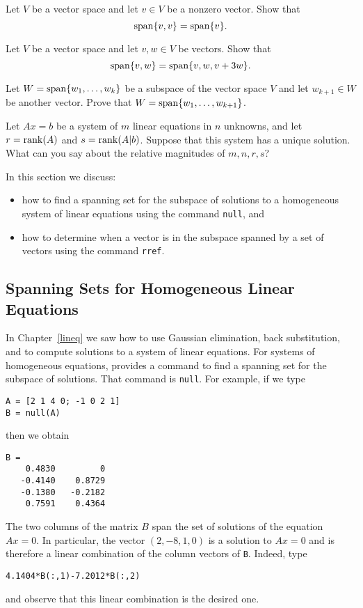 \begin{exercise} \label{c5.2.8a}
Let $V$ be a vector space and let $v\in V$ be a nonzero vector.  Show that
\[
{\rm span}\{v,v\}={\rm span}\{v\}.
\]
\end{exercise}
\begin{exercise} \label{c5.2.8b}
Let $V$ be a vector space and let $v,w\in V$ be vectors.  Show that
\[
{\rm span}\{v,w\}={\rm span}\{v,w,v+3w\}.
\]
\end{exercise}

\begin{exercise} \label{c5.2.9}
Let $W={\rm span}\{w_1,\ldots,w_k\}$ be a subspace of the vector
space $V$ and let $w_{k+1}\in W$ be another vector.  Prove that
$W={\rm span}\{w_1,\ldots,w_{k+1}\}$.
\end{exercise}

\begin{exercise} \label{c5.2.10}
Let $Ax=b$ be a system of $m$ linear equations in $n$ unknowns,
and let $r={\rm rank}(A)$ and $s={\rm rank}(A|b)$.  Suppose that this system
has a unique solution.  What can you say about the relative
magnitudes of $m,n,r,s$?
\end{exercise}


 \label{S:5.3}

In this section we discuss:
\begin{itemize}
\item	how to find a spanning set for the subspace of solutions to a
homogeneous system of linear equations using the \Matlab command {\tt null},
and
\item	how to determine when a vector is in the subspace spanned by a
set of vectors using the \Matlab command {\tt rref}.
\end{itemize}

\subsection*{Spanning Sets for Homogeneous Linear Equations}

In Chapter~\ref{lineq} we saw how to use Gaussian elimination,
back substitution, and \Matlab to compute solutions to a system
of linear equations.  For systems of
homogeneous equations, \Matlab
provides a command to find a spanning set for the subspace of solutions.
That command is {\tt null}.  For example, if we type
\begin{verbatim}
A = [2 1 4 0; -1 0 2 1]
B = null(A)
\end{verbatim} 
then we obtain
\begin{verbatim}
B =
    0.4830         0
   -0.4140    0.8729
   -0.1380   -0.2182
    0.7591    0.4364
\end{verbatim}
The two columns of the matrix $B$ span the set of solutions of
the equation $Ax=0$.  In particular, the vector $(2,-8,1,0)$ is a
solution to $Ax=0$ and is therefore a
linear combination  of the
column vectors of {\tt B}.  Indeed, type
\begin{verbatim}
4.1404*B(:,1)-7.2012*B(:,2)
\end{verbatim}
and observe that this linear combination is the desired one.

